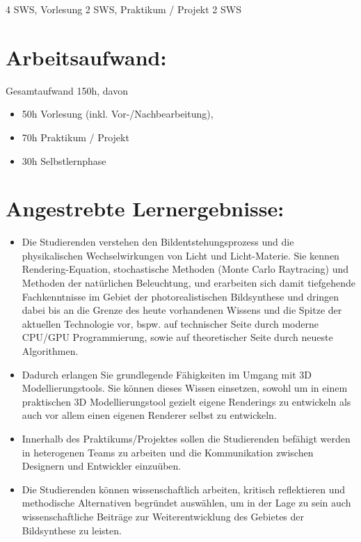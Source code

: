 4 SWS, Vorlesung 2 SWS, Praktikum / Projekt 2 SWS

\section*{Arbeitsaufwand:}\label{arbeitsaufwand-22}

Gesamtaufwand 150h, davon

\begin{itemize}
\item
  50h Vorlesung (inkl. Vor-/Nachbearbeitung),
\item
  70h Praktikum / Projekt
\item
  30h Selbstlernphase
\end{itemize}

\section*{Angestrebte
Lernergebnisse:}\label{angestrebte-lernergebnisse-16}

\begin{itemize}
\item
  Die Studierenden verstehen den Bildentstehungsprozess und die
  physikalischen Wechselwirkungen von Licht und Licht-Materie. Sie
  kennen Rendering-Equation, stochastische Methoden (Monte Carlo
  Raytracing) und Methoden der natürlichen Beleuchtung, und erarbeiten
  sich damit tiefgehende Fachkenntnisse im Gebiet der photorealistischen
  Bildsynthese und dringen dabei bis an die Grenze des heute vorhandenen
  Wissens und die Spitze der aktuellen Technologie vor, bspw. auf
  technischer Seite durch moderne CPU/GPU Programmierung, sowie auf
  theoretischer Seite durch neueste Algorithmen.
\item
  Dadurch erlangen Sie grundlegende Fähigkeiten im Umgang mit 3D
  Modellierungstools. Sie können dieses Wissen einsetzen, sowohl um in
  einem praktischen 3D Modellierungstool gezielt eigene Renderings zu
  entwickeln als auch vor allem einen eigenen Renderer selbst zu
  entwickeln.
\item
  Innerhalb des Praktikums/Projektes sollen die Studierenden befähigt
  werden in heterogenen Teams zu arbeiten und die Kommunikation zwischen
  Designern und Entwickler einzuüben.
\item
  Die Studierenden können wissenschaftlich arbeiten, kritisch
  reflektieren und methodische Alternativen begründet auswählen, um in
  der Lage zu sein auch wissenschaftliche Beiträge zur Weiterentwicklung
  des Gebietes der Bildsynthese zu leisten.
\end{itemize}

